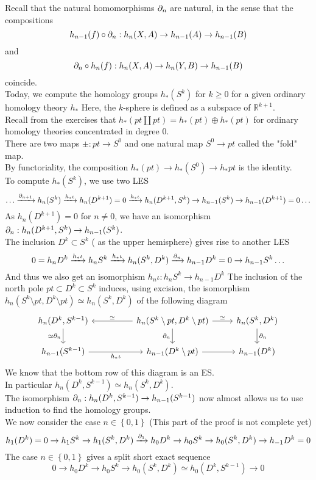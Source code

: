 \documentclass[../main.tex]{subfiles}
\begin{document}
Recall that the natural homomorphisms $\partial_n$ are natural, in the sense that the compositions
\[ 
h_{n-1} ( f) \circ\partial_n : h_n( X,A) \to h_{n-1} ( A) \to h_{n-1} ( B) 
\]
and
\[ 
\partial_n \circ h_n( f) : h_n( X,A) \to h_n( Y,B) \to h_{n-1} ( B) 
\]
coincide.\\
Today, we compute the homology groups $h_\ast( S^{k}) $ for $k \geq 0$ for a given ordinary homology theory $h_\ast$ 
Here, the $k$-sphere is defined as a subspace of $\mathbb{R}^{k+1}$.\\
Recall from the exercises that $h_\ast( pt \coprod pt) = h_\ast( pt) \oplus h_\ast( pt) $ for ordinary homology theories concentrated in degree 0.\\
There are two maps $\pm: pt\to S^{0} $ and one natural map $S^{0}\to pt$ called the "fold" map.\\
By functoriality, the composition $h_\ast( pt) \to h_\ast( S^{0}) \to h_\ast pt$ is the identity.\\
To compute $h_\ast( S^{k}) $, we use two LES 
\[ 
	\ldots\xrightarrow{\partial_{n+1}} h_n( S^{k}) \xrightarrow{h_\ast\iota} h_n( D^{k+1})= 0  \xrightarrow{h_\ast \iota} h_n( D^{k+1},S^{k}) \to h_{n-1} ( S^{k}) \to h_{n-1} ( D^{k+1}) =0  \ldots
\]
As $h_n( D^{k+1}) =0 $ for $n\neq 0$, we have an isomorphism $\partial_n:h_n( D^{k+1},S^{k}) \to h_{n-1} ( S^{k}) $.\\
The inclusion $D^{k}\subset S^{k}$ ( as the upper hemisphere) gives rise to another LES
\[ 
	0= h_n D^{k}\xrightarrow{h_\ast\iota} h_nS^{k} \xrightarrow{h_\ast\iota} h_n( S^{k},D^{k} ) \xrightarrow{\partial_n} h_{n-1} D^{k}=0\to h_{n-1}  S^{k} \ldots 
\]
And thus we also get an isomorphism $ h_n \iota: h_n S^{k}\to h_{n-1} D^{k} $ 
The inclusion of the north pole $pt \subset D^{k} \subset S^{k}$ induces, using excision, the isomorphism $h_n( S^{k}\setminus pt, D^{k}\setminus pt)\simeq h_n( S^{k}, D^{k})$ of the following diagram
\[\begin{tikzcd}
	{h_n(D^k,S^{k-1})} && {h_n(S^k\setminus pt, D^k\setminus pt)} & {h_n(S^k,D^k)} \\
	{h_{n-1}(S^{k-1})} && {h_{n-1}(D^k\setminus pt)} & {h_{n-1}(D^k)}
	\arrow["{\del_n}"', from=1-3, to=2-3]
	\arrow[from=2-3, to=2-4]
	\arrow["\simeq", from=1-3, to=1-4]
	\arrow["{\del_n}", from=1-4, to=2-4]
	\arrow["{\simeq }"', from=1-3, to=1-1]
	\arrow["{\simeq \del_n}"', from=1-1, to=2-1]
	\arrow["{h_\ast\iota}"', from=2-1, to=2-3]
\end{tikzcd}\]
We know that the bottom row of this diagram is an ES.\\
In particular $ h_n( D^{k},S^{k-1})\simeq h_n ( S^{k},D^{k})$.\\
The isomorphism $\partial_n: h_{n} ( D^{k},S^{k-1}) \to h_{n-1} ( S^{k-1}) $ now almost allows us to use induction to find the homology groups.\\
We now consider the case $n \in \left\{ 0,1 \right\} $ 
(This part of the proof is not complete yet) 
\[ 
	h_1( D^{k}) = 0 \to h_1 S^{k} \to h_1( S^{k},D^{k}) \xrightarrow{\partial_1} h_0 D^{k}\to h_0 S^{k}\to h_0 ( S^{k},D^{k}) \to h_{-1} D^{k}=0
\]
The case $n\in \left\{ 0,1 \right\} $ gives a split short exact sequence 
\[ 
0 \to h_0 D^{k}\to h_0S^{k} \to h_0( S^{k},D^{k}) \simeq h_0( D^{k},S^{k-1}) \to 0
\]
\end{document}

